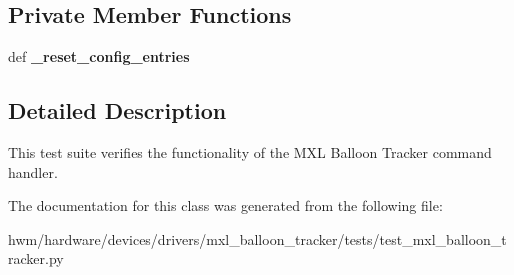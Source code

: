 \subsection*{Private Member Functions}
\begin{DoxyCompactItemize}
\item 
\hypertarget{classhwm_1_1hardware_1_1devices_1_1drivers_1_1mxl__balloon__tracker_1_1tests_1_1test__mxl__ballo580f1655922408baf8d87971eb9118f3_a5042e1f25679d65d07abe87446e7bca9}{def {\bfseries \-\_\-reset\-\_\-config\-\_\-entries}}\label{classhwm_1_1hardware_1_1devices_1_1drivers_1_1mxl__balloon__tracker_1_1tests_1_1test__mxl__ballo580f1655922408baf8d87971eb9118f3_a5042e1f25679d65d07abe87446e7bca9}

\end{DoxyCompactItemize}


\subsection{Detailed Description}
This test suite verifies the functionality of the M\-X\-L Balloon Tracker command handler. 

The documentation for this class was generated from the following file\-:\begin{DoxyCompactItemize}
\item 
hwm/hardware/devices/drivers/mxl\-\_\-balloon\-\_\-tracker/tests/test\-\_\-mxl\-\_\-balloon\-\_\-tracker.\-py\end{DoxyCompactItemize}
